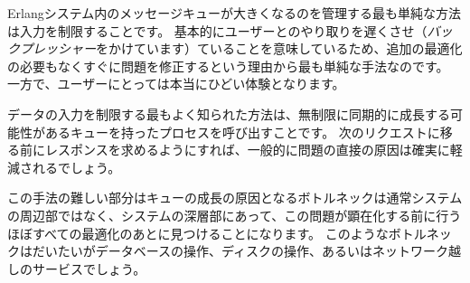 Erlangシステム内のメッセージキューが大きくなるのを管理する最も単純な方法は入力を制限することです。
基本的にユーザーとのやり取りを遅くさせ（\emph{バックプレッシャー}をかけています）ていることを意味しているため、追加の最適化の必要もなくすぐに問題を修正するという理由から最も単純な手法なのです。
一方で、ユーザーにとっては本当にひどい体験となります。

データの入力を制限する最もよく知られた方法は、無制限に同期的に成長する可能性があるキューを持ったプロセスを呼び出すことです。
次のリクエストに移る前にレスポンスを求めるようにすれば、一般的に問題の直接の原因は確実に軽減されるでしょう。

この手法の難しい部分はキューの成長の原因となるボトルネックは通常システムの周辺部ではなく、システムの深層部にあって、この問題が顕在化する前に行うほぼすべての最適化のあとに見つけることになります。
このようなボトルネックはだいたいがデータベースの操作、ディスクの操作、あるいはネットワーク越しのサービスでしょう。

